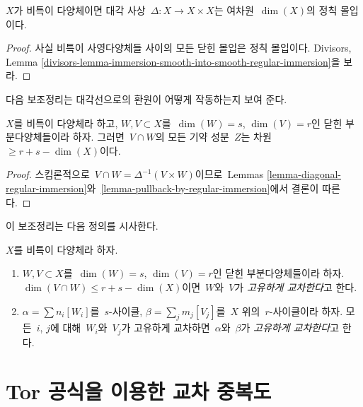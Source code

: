 \begin{lemma}
\label{lemma-diagonal-regular-immersion}
$X$가 비특이 다양체이면 대각 사상\ 
$\Delta : X \to X \times X$는 여차원\  $\dim(X)$의 정칙 몰입이다.
\end{lemma}

\begin{proof}
사실 비특이 사영다양체들 사이의 모든 닫힌 몰입은 정칙 몰입이다.
Divisors, Lemma
\ref{divisors-lemma-immersion-smooth-into-smooth-regular-immersion}을 보라.
\end{proof}

\noindent
다음 보조정리는 대각선으로의 환원이 어떻게 작동하는지 보여 준다.

\begin{lemma}
\label{lemma-intersect-in-smooth}
$X$를 비특이 다양체라 하고, $W,V \subset X$를\ 
$\dim(W) = s$, $\dim(V) = r$인 닫힌 부분다양체들이라 하자.
그러면\  $V \cap W$의 모든 기약 성분\  $Z$는
차원\  $\geq r + s - \dim(X)$이다.
\end{lemma}

\begin{proof}
스킴론적으로\  $V \cap W = \Delta^{-1}(V \times W)$이므로\ 
Lemmas \ref{lemma-diagonal-regular-immersion}와\ 
\ref{lemma-pullback-by-regular-immersion}에서 결론이 따른다.
\end{proof}

\noindent
이 보조정리는 다음 정의를 시사한다.

\begin{definition}
\label{definition-proper-intersection}
$X$를 비특이 다양체라 하자.
\begin{enumerate}
\item $W,V \subset X$를\  $\dim(W) = s$, $\dim(V) = r$인 닫힌
부분다양체들이라 하자. $\dim(V \cap W) \leq r + s - \dim(X)$이면\ 
$W$와\  $V$가 {\it 고유하게 교차한다}고 한다.
\item $\alpha = \sum n_i [W_i]$를\  $s$-사이클,
$\beta = \sum_j m_j [V_j]$를\  $X$ 위의\  $r$-사이클이라 하자.
모든\  $i$, $j$에 대해\  $W_i$와\  $V_j$가 고유하게 교차하면\ 
$\alpha$와\  $\beta$가 {\it 고유하게 교차한다}고 한다.
\end{enumerate}
\end{definition}


\section{Tor 공식을 이용한 교차 중복도}
\label{section-tor-formula}

